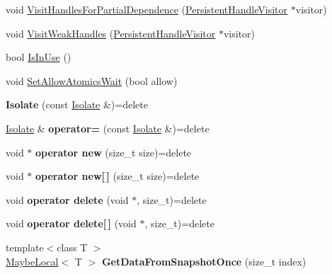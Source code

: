 \begin{DoxyCompactItemize}
\item 
void \mbox{\hyperlink{classv8_1_1Isolate_ac5a3ecbb7ef90476150a20904c522744}{Visit\+Handles\+For\+Partial\+Dependence}} (\mbox{\hyperlink{classv8_1_1PersistentHandleVisitor}{Persistent\+Handle\+Visitor}} $\ast$visitor)
\item 
void \mbox{\hyperlink{classv8_1_1Isolate_a4f821750a43d17e51778b281ce2c1fcd}{Visit\+Weak\+Handles}} (\mbox{\hyperlink{classv8_1_1PersistentHandleVisitor}{Persistent\+Handle\+Visitor}} $\ast$visitor)
\item 
bool \mbox{\hyperlink{classv8_1_1Isolate_a961a5591bb2a3febda9e2974f21c4d15}{Is\+In\+Use}} ()
\item 
void \mbox{\hyperlink{classv8_1_1Isolate_aa3d534382a9d1c562b1967e57dabd7f8}{Set\+Allow\+Atomics\+Wait}} (bool allow)
\item 
\mbox{\label{classv8_1_1Isolate_ab32a76ce68a6a690ccd1da0bdc52106e}} 
{\bfseries Isolate} (const \mbox{\hyperlink{classv8_1_1Isolate}{Isolate}} \&)=delete
\item 
\mbox{\label{classv8_1_1Isolate_a12927059b6c6c37cb3437e4fac7d00a8}} 
\mbox{\hyperlink{classv8_1_1Isolate}{Isolate}} \& {\bfseries operator=} (const \mbox{\hyperlink{classv8_1_1Isolate}{Isolate}} \&)=delete
\item 
\mbox{\label{classv8_1_1Isolate_ac43958c71a18252579fbabb2ad07eb4b}} 
void $\ast$ {\bfseries operator new} (size\+\_\+t size)=delete
\item 
\mbox{\label{classv8_1_1Isolate_a9bf8c64ade16e134821f1da8d750acca}} 
void $\ast$ {\bfseries operator new\mbox{[}$\,$\mbox{]}} (size\+\_\+t size)=delete
\item 
\mbox{\label{classv8_1_1Isolate_a53d3943872932fd1f91eb35044a691a8}} 
void {\bfseries operator delete} (void $\ast$, size\+\_\+t)=delete
\item 
\mbox{\label{classv8_1_1Isolate_a9fb08d197b89ed4049ed00217bb08ee2}} 
void {\bfseries operator delete\mbox{[}$\,$\mbox{]}} (void $\ast$, size\+\_\+t)=delete
\item 
\mbox{\label{classv8_1_1Isolate_ae705790bcf36174b2d8fdd0bd0f9b753}} 
{\footnotesize template$<$class T $>$ }\\\mbox{\hyperlink{classv8_1_1MaybeLocal}{Maybe\+Local}}$<$ T $>$ {\bfseries Get\+Data\+From\+Snapshot\+Once} (size\+\_\+t index)
\end{DoxyCompactItemize}
